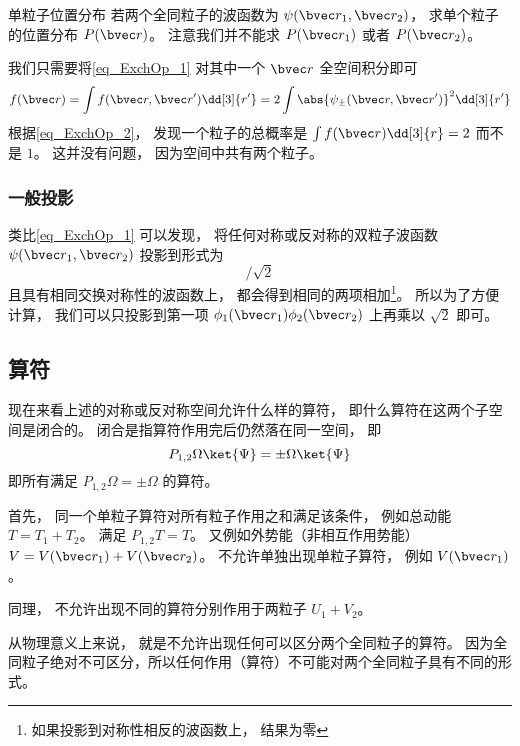 \begin{example}{单粒子位置分布}\label{ex_ExchOp_1}
若两个全同粒子的波函数为 $\psi(\bvec r_1,\bvec r_2)$， 求单个粒子的位置分布 $P(\bvec r)$。 注意我们并不能求 $P(\bvec r_1)$ 或者 $P(\bvec r_2)$。

我们只需要将\autoref{eq_ExchOp_1} 对其中一个 $\bvec r$ 全空间积分即可
\begin{equation}
f(\bvec r) = \int f(\bvec r, \bvec r') \dd[3]{r'} = 2\int \abs{\psi_\pm(\bvec r, \bvec r')}^2 \dd[3]{r'} 
\end{equation}
根据\autoref{eq_ExchOp_2}， 发现一个粒子的总概率是 $\int f(\bvec r) \dd[3]{r} = 2$ 而不是 $1$。 这并没有问题， 因为空间中共有两个粒子。
\end{example}

\subsubsection{一般投影}
类比\autoref{eq_ExchOp_1} 可以发现， 将任何对称或反对称的双粒子波函数 $\psi(\bvec r_1, \bvec r_2)$ 投影到形式为
\begin{equation}
[\phi_1(\bvec r_1)\phi_2(\bvec r_2) \pm \phi_2(\bvec r_1)\phi_1(\bvec r_2)]/\sqrt{2}
\end{equation}
且具有相同交换对称性的波函数上， 都会得到相同的两项相加\footnote{如果投影到对称性相反的波函数上， 结果为零}。 所以为了方便计算， 我们可以只投影到第一项 $\phi_1(\bvec r_1)\phi_2(\bvec r_2)$ 上再乘以 $\sqrt{2}$ 即可。

\subsection{算符}
现在来看上述的对称或反对称空间允许什么样的算符， 即什么算符在这两个子空间是闭合的。 闭合是指算符作用完后仍然落在同一空间， 即
\begin{equation}
P_{1,2}\Omega\ket{\Psi} = \pm \Omega \ket{\Psi}
\end{equation}
即所有满足 $P_{1,2}\Omega = \pm \Omega$ 的算符。

首先， 同一个单粒子算符对所有粒子作用之和满足该条件， 例如总动能 $T = T_1 + T_2$。 满足 $P_{1,2}T = T$。 又例如外势能（非相互作用势能） $V = V(\bvec r_1) + V(\bvec r_2)$。 不允许单独出现单粒子算符， 例如 $V(\bvec r_1)$。

同理， 不允许出现不同的算符分别作用于两粒子 $U_1 + V_2$。

从物理意义上来说， 就是不允许出现任何可以区分两个全同粒子的算符。 因为全同粒子绝对不可区分，所以任何作用（算符）不可能对两个全同粒子具有不同的形式。

